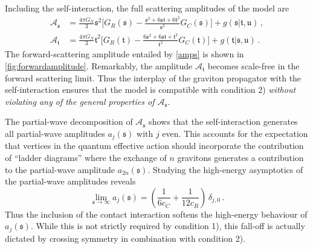 \documentclass[aps,prl,reprint,twocolumn,superscriptaddress,longbibliography,nofootinbib,floatfix,showpacs]{revtex4-1}
\newcommand{\be}{\begin{equation}}
\newcommand{\ee}{\end{equation}}
\newcommand{\mans}{\ensuremath{\mathfrak{s}}}
\newcommand{\mant}{\ensuremath{\mathfrak{t}}}
\newcommand{\manu}{\ensuremath{\mathfrak{u}}}
\newcommand{\modelname}{model}
\begin{document}
Including the self-interaction, the full scattering amplitudes of the \modelname{} are 
%
\begin{equation}\label{amps}
\begin{aligned}
 \mathcal A_\mans &= \frac{4\pi G_N}{3} \mans^2 \bigg[ G_R(\mans) -	\tfrac{\mans^2+6\mans\mant+6\mant^2}{\mans^2} G_C(\mans) \bigg] + g(\mans|\mant,\manu) \, , \\
 \mathcal A_\mant &= \frac{4\pi G_N}{3} \mant^2 \bigg[ G_R(\mant) -	\tfrac{6\mans^2+6\mans\mant+\mant^2}{\mant^2} G_C(\mant) \bigg] + g(\mant|\mans,\manu) \, .
\end{aligned}
\end{equation}
%
The forward-scattering amplitude entailed by \eqref{amps} is shown in \autoref{fig:forwardamplitude}.
Remarkably, the amplitude $\mathcal A_\mant$  becomes scale-free in the forward scattering limit. 
Thus the interplay of the graviton propagator with the self-interaction ensures that the model is compatible with condition 2) \emph{without violating any of the general properties of $\mathcal A_\mans$}.

 
The partial-wave decomposition of $\mathcal A_\mans$ shows that the self-interaction generates all partial-wave amplitudes $a_j(\mans)$ with $j$ even.
This accounts for the expectation that vertices in the quantum effective action should incorporate the contribution of ``ladder diagrams'' where the exchange of $n$ gravitons  generates a contribution to the partial-wave amplitude $a_{2n}(\mans)$.
Studying the high-energy asymptotics of the partial-wave amplitudes reveals
%
\be\label{spinres}
 \lim_{\mans \rightarrow \infty} a_j(\mans) = \left( \frac{1}{6c_C} + \frac{1}{12c_R} \right) \, \delta_{j,0} \, .%
\ee
%
Thus the inclusion of the contact interaction softens the high-energy behaviour of $a_j(\mans)$. While this is not strictly required by condition 1), this fall-off is actually dictated by crossing symmetry in combination with condition 2).
\end{document}
